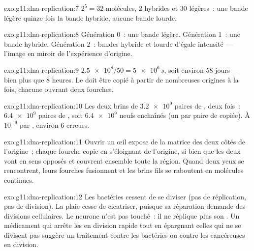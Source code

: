 \begin{solution}{exo:g11:dna-replication:7}
$2^5 = 32$ molécules, 2 hybrides et 30 légères~: une bande légère
quinze fois la bande hybride, aucune bande lourde.
\end{solution}

\begin{solution}{exo:g11:dna-replication:8}
Génération 0~: une bande légère. Génération 1~: une bande hybride.
Génération 2~: bandes hybride et lourde d'égale intensité --- l'image
en miroir de l'expérience d'origine.
\end{solution}

\begin{solution}{exo:g11:dna-replication:9}
$\num{2.5e8}/50 = \num{5e6}\,\unit{s}$, soit environ 58 jours --- bien
plus que 8 heures. Le  doit être copié à partir de nombreuses
origines à la fois, chacune ouvrant deux fourches.
\end{solution}

\begin{solution}{exo:g11:dna-replication:10}
Les deux brins de $\num{3.2e9}$ paires de , deux fois~:
$\num{6.4e9}$ paires de , soit $\num{6.4e9}$  neufs
enchaînés (un par paire de  copiée). À $10^{-9}$ par ,
environ 6 erreurs.
\end{solution}

\begin{solution}{exo:g11:dna-replication:11}
Ouvrir un œil expose de la matrice des deux côtés de l'origine~; chaque
fourche copie en s'éloignant de l'origine, si bien que les deux vont en
sens opposés et couvrent ensemble toute la région. Quand deux yeux se
rencontrent, leurs fourches fusionnent et les brins fils se raboutent
en molécules continues.
\end{solution}

\begin{solution}{exo:g11:dna-replication:12}
Les bactéries cessent de se diviser (pas de réplication, pas de
division). La plaie cesse de cicatriser, puisque sa réparation demande
des divisions cellulaires. Le neurone n'est pas touché~: il ne réplique
plus son . Un médicament qui arrête les  en division rapide
tout en épargnant celles qui ne se divisent pas suggère un traitement
contre les bactéries ou contre les  cancéreuses en division.
\end{solution}

